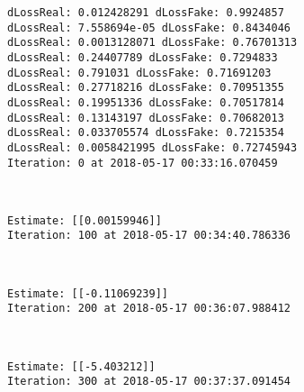 \documentclass[11pt]{article}
\begin{document}
    \begin{Verbatim}[commandchars=\\\{\}]
dLossReal: 0.012428291 dLossFake: 0.9924857
dLossReal: 7.558694e-05 dLossFake: 0.8434046
dLossReal: 0.0013128071 dLossFake: 0.76701313
dLossReal: 0.24407789 dLossFake: 0.7294833
dLossReal: 0.791031 dLossFake: 0.71691203
dLossReal: 0.27718216 dLossFake: 0.70951355
dLossReal: 0.19951336 dLossFake: 0.70517814
dLossReal: 0.13143197 dLossFake: 0.70682013
dLossReal: 0.033705574 dLossFake: 0.7215354
dLossReal: 0.0058421995 dLossFake: 0.72745943
Iteration: 0 at 2018-05-17 00:33:16.070459

    \end{Verbatim}

    \begin{center}
    \end{center}
    { \hspace*{\fill} \\}
    
    \begin{Verbatim}[commandchars=\\\{\}]
Estimate: [[0.00159946]]
Iteration: 100 at 2018-05-17 00:34:40.786336

    \end{Verbatim}

    \begin{center}
    \end{center}
    { \hspace*{\fill} \\}
    
    \begin{Verbatim}[commandchars=\\\{\}]
Estimate: [[-0.11069239]]
Iteration: 200 at 2018-05-17 00:36:07.988412

    \end{Verbatim}

    \begin{center}
    \end{center}
    { \hspace*{\fill} \\}
    
    \begin{Verbatim}[commandchars=\\\{\}]
Estimate: [[-5.403212]]
Iteration: 300 at 2018-05-17 00:37:37.091454

    \end{Verbatim}
\end{document}
